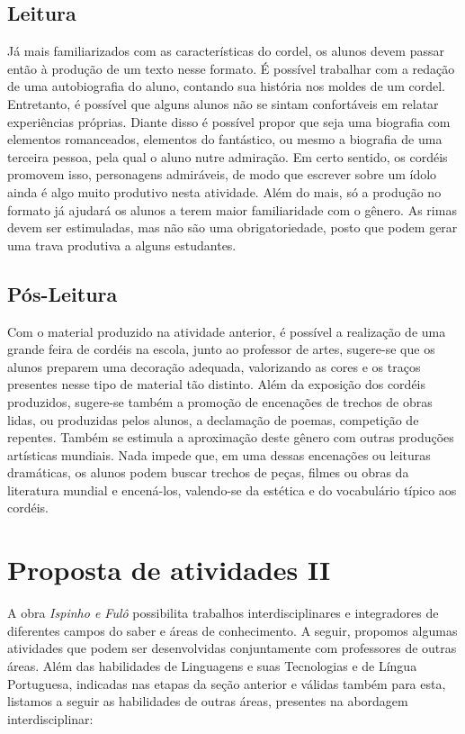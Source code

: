 \documentclass[12pt]{extarticle}
\begin{document}
\subsection{Leitura}



Já mais familiarizados com as características do cordel, os
alunos devem passar então à produção de um texto nesse formato. É
possível trabalhar com a redação de uma autobiografia do aluno, contando
sua história nos moldes de um cordel. Entretanto, é possível que alguns
alunos não se sintam confortáveis em relatar experiências próprias.
Diante disso é possível propor que seja uma biografia com elementos
romanceados, elementos do fantástico, ou mesmo a biografia de uma
terceira pessoa, pela qual o aluno nutre admiração. Em certo sentido, os
cordéis promovem isso, personagens admiráveis, de modo que escrever
sobre um ídolo ainda é algo muito produtivo nesta atividade. Além do
mais, só a produção no formato já ajudará os alunos a terem maior
familiaridade com o gênero. As rimas devem ser estimuladas, mas não são
uma obrigatoriedade, posto que podem gerar uma trava produtiva a alguns
estudantes.


\subsection{Pós-Leitura}

 Com o material produzido na atividade anterior, é possível a
realização de uma grande feira de cordéis na escola, junto ao professor
de artes, sugere-se que os alunos preparem uma decoração adequada,
valorizando as cores e os traços presentes nesse tipo de material tão
distinto. Além da exposição dos cordéis produzidos, sugere-se também a
promoção de encenações de trechos de obras lidas, ou produzidas pelos
alunos, a declamação de poemas, competição de repentes. Também se
estimula a aproximação deste gênero com outras produções artísticas
mundiais. Nada impede que, em uma dessas encenações ou leituras
dramáticas, os alunos podem buscar trechos de peças, filmes ou obras da
literatura mundial e encená-los, valendo-se da estética e do vocabulário
típico aos cordéis.

\section{Proposta de atividades II}
A obra \emph{Ispinho e Fulô} possibilita trabalhos interdisciplinares e
integradores de diferentes campos do saber e áreas de conhecimento. A
seguir, propomos algumas atividades que podem ser desenvolvidas
conjuntamente com professores de outras áreas. Além das habilidades de
Linguagens e suas Tecnologias e de Língua Portuguesa, indicadas nas
etapas da seção anterior e válidas também para esta, listamos a seguir
as habilidades de outras áreas, presentes na abordagem interdisciplinar:
\end{document}
